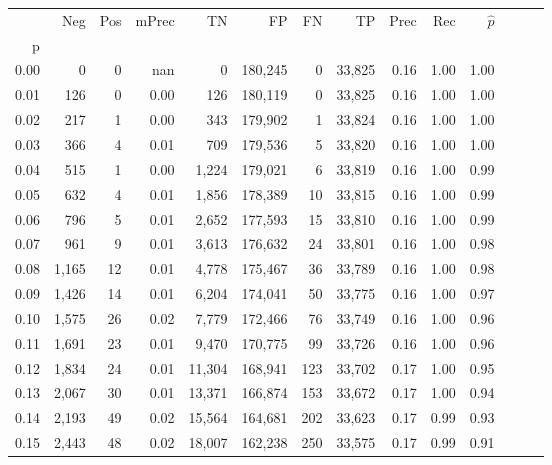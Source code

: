 \begin{tabular}{rrrrrrrrrrrrrr}
\toprule
{} &    Neg &  Pos & mPrec &       TN &       FP &      FN &      TP &  Prec &   Rec & $\hat{p}$ \\
p    &        &      &       &          &          &         &         &       &       &           \\
\midrule
0.00 &      0 &    0 &   nan &        0 &  180,245 &       0 &  33,825 &  0.16 &  1.00 &      1.00 \\
0.01 &    126 &    0 &  0.00 &      126 &  180,119 &       0 &  33,825 &  0.16 &  1.00 &      1.00 \\
0.02 &    217 &    1 &  0.00 &      343 &  179,902 &       1 &  33,824 &  0.16 &  1.00 &      1.00 \\
0.03 &    366 &    4 &  0.01 &      709 &  179,536 &       5 &  33,820 &  0.16 &  1.00 &      1.00 \\
0.04 &    515 &    1 &  0.00 &    1,224 &  179,021 &       6 &  33,819 &  0.16 &  1.00 &      0.99 \\
0.05 &    632 &    4 &  0.01 &    1,856 &  178,389 &      10 &  33,815 &  0.16 &  1.00 &      0.99 \\
0.06 &    796 &    5 &  0.01 &    2,652 &  177,593 &      15 &  33,810 &  0.16 &  1.00 &      0.99 \\
0.07 &    961 &    9 &  0.01 &    3,613 &  176,632 &      24 &  33,801 &  0.16 &  1.00 &      0.98 \\
0.08 &  1,165 &   12 &  0.01 &    4,778 &  175,467 &      36 &  33,789 &  0.16 &  1.00 &      0.98 \\
0.09 &  1,426 &   14 &  0.01 &    6,204 &  174,041 &      50 &  33,775 &  0.16 &  1.00 &      0.97 \\
0.10 &  1,575 &   26 &  0.02 &    7,779 &  172,466 &      76 &  33,749 &  0.16 &  1.00 &      0.96 \\
0.11 &  1,691 &   23 &  0.01 &    9,470 &  170,775 &      99 &  33,726 &  0.16 &  1.00 &      0.96 \\
0.12 &  1,834 &   24 &  0.01 &   11,304 &  168,941 &     123 &  33,702 &  0.17 &  1.00 &      0.95 \\
0.13 &  2,067 &   30 &  0.01 &   13,371 &  166,874 &     153 &  33,672 &  0.17 &  1.00 &      0.94 \\
0.14 &  2,193 &   49 &  0.02 &   15,564 &  164,681 &     202 &  33,623 &  0.17 &  0.99 &      0.93 \\
0.15 &  2,443 &   48 &  0.02 &   18,007 &  162,238 &     250 &  33,575 &  0.17 &  0.99 &      0.91 \\

\end{tabular}
